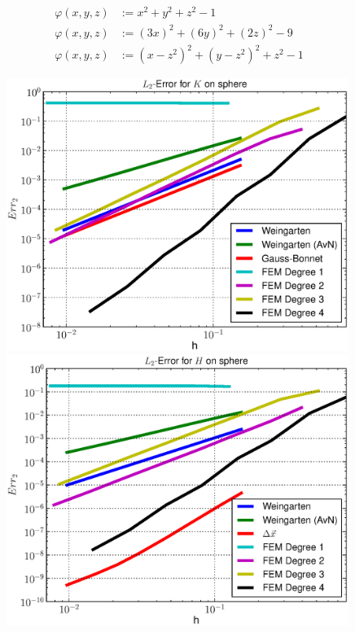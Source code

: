   \begin{align}
    \label{eqSphere}
    \varphi\left( x,y,z \right) &:= x^{2} + y^{2} + z^{2} - 1 \\
    \label{eqEllipsoid}
    \varphi\left( x,y,z \right) &:= \left( 3x \right)^{2} + \left( 6y \right)^{2} + \left( 2z \right)^{2} - 9\\
    \label{eqQuartic}
    \varphi\left( x,y,z \right) &:= \left( x - z^{2} \right)^{2} + \left( y - z^{2} \right)^{2} + z^{2} - 1
  \end{align}

  \begin{figure}
    \begin{minipage}[htp]{.23\textwidth}
      \centering
      \includegraphics[width=0.99\textwidth]{bilder/sphere/L2K.eps}
    \end{minipage}\hfill
    \begin{minipage}[htp]{.23\textwidth}
      \centering
      \includegraphics[width=0.99\textwidth]{bilder/sphere/L2H.eps}

\end{minipage}
\end{figure}
